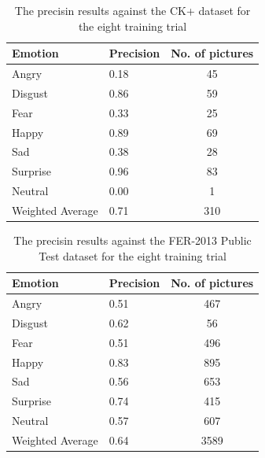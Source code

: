 \documentclass[runningheads,a4paper,11pt]{report}
\begin{document}
\begin{table}[htbp]
	\caption{The precisin results against the CK+ dataset for the eight training trial}
	\label{fer_training_28k_01_mean_square_augmented_x6_ckp}
		\begin{center}
			\begin{tabular}{p{110pt}p{110pt}c}
				\textbf{Emotion}& \textbf{Precision}& \textbf{No. of pictures} \\
				\hline\hline
				Angry& 0.18& 45 \\
				Disgust& 0.86& 59 \\
				Fear& 0.33& 25 \\
				Happy& 0.89& 69 \\
				Sad& 0.38& 28 \\
				Surprise& 0.96& 83 \\
				Neutral& 0.00& 1 \\
				\hline
				Weighted Average& 0.71& 310
			\end{tabular}
		\end{center}
\end{table}
\begin{table}[htbp]
	\caption{The precisin results against the FER-2013 Public Test dataset for the eight training trial}
	\label{fer_training_28k_01_mean_square_augmented_x6_public_test}
		\begin{center}
			\begin{tabular}{p{110pt}p{110pt}c}
				\textbf{Emotion}& \textbf{Precision}& \textbf{No. of pictures} \\
				\hline\hline
				Angry& 0.51& 467 \\
				Disgust& 0.62& 56 \\
				Fear& 0.51& 496 \\
				Happy& 0.83& 895 \\
				Sad& 0.56& 653 \\
				Surprise& 0.74& 415 \\
				Neutral& 0.57& 607 \\
				\hline
				Weighted Average& 0.64 &3589
			\end{tabular}
		\end{center}
\end{table}
\end{document}
